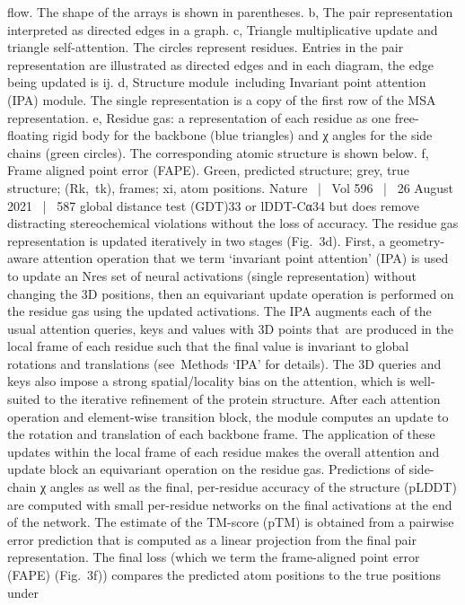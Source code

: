 flow. The shape of the arrays is shown in parentheses. b, The pair representation
interpreted as directed edges in a graph. c, Triangle multiplicative update and
triangle self-attention. The circles represent residues. Entries in the pair
representation are illustrated as directed edges and in each diagram, the edge
being updated is ij. d, Structure module including Invariant point attention (IPA)
module. The single representation is a copy of the first row of the MSA
representation. e, Residue gas: a representation of each residue as one
free-floating rigid body for the backbone (blue triangles) and χ angles for the
side chains (green circles). The corresponding atomic structure is shown below.
f, Frame aligned point error (FAPE). Green, predicted structure; grey, true
structure; (Rk, tk), frames; xi, atom positions.
Nature  |  Vol 596  |  26 August 2021  |  587
global distance test (GDT)33 or lDDT-Cα34 but does remove distracting
stereochemical violations without the loss of accuracy.
The residue gas representation is updated iteratively in two stages
(Fig. 3d). First, a geometry-aware attention operation that we term
‘invariant point attention’ (IPA) is used to update an Nres set of neural
activations (single representation) without changing the 3D positions,
then an equivariant update operation is performed on the residue gas
using the updated activations. The IPA augments each of the usual
attention queries, keys and values with 3D points that are produced
in the local frame of each residue such that the final value is invariant
to global rotations and translations (see Methods ‘IPA’ for details). The
3D queries and keys also impose a strong spatial/locality bias on the
attention, which is well-suited to the iterative refinement of the protein
structure. After each attention operation and element-wise transition
block, the module computes an update to the rotation and translation
of each backbone frame. The application of these updates within the
local frame of each residue makes the overall attention and update
block an equivariant operation on the residue gas.
Predictions of side-chain χ angles as well as the final, per-residue
accuracy of the structure (pLDDT) are computed with small per-residue
networks on the final activations at the end of the network. The estimate
of the TM-score (pTM) is obtained from a pairwise error prediction that
is computed as a linear projection from the final pair representation. The
final loss (which we term the frame-aligned point error (FAPE) (Fig. 3f))
compares the predicted atom positions to the true positions under
